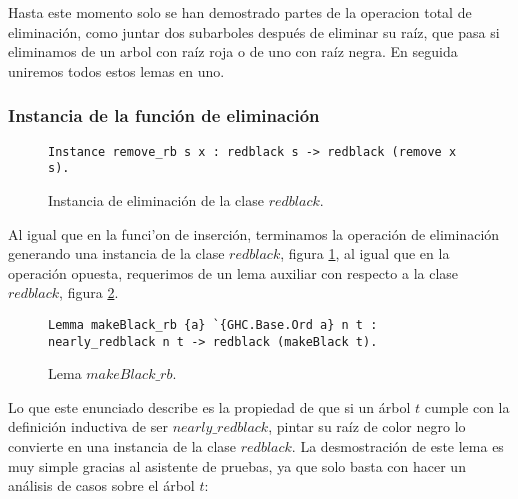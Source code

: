 Hasta este momento solo se han demostrado partes de la operacion total de eliminación, como juntar
dos subarboles despu\'es de eliminar su ra\'iz, que pasa si eliminamos de un arbol con raíz roja o
de uno con raíz negra. En seguida uniremos todos estos lemas en uno.

\subsubsection{Instancia de la funci\'on de eliminaci\'on}

\begin{figure}[!ht]
\centering
\captionsetup{justification=centering}
\begin{verbatim}
Instance remove_rb s x : redblack s -> redblack (remove x s).
\end{verbatim}
\caption{Instancia de eliminaci\'on de la clase $redblack$.}
\label{instance_del}
\end{figure}


Al igual que en la funci'on de inserción, terminamos la operación de eliminaci\'on generando una
instancia de la clase $redblack$, figura \ref{instance_del}, al igual que en la operación opuesta,
requerimos de un lema auxiliar con respecto a la clase $redblack$, figura \ref{lema_7}.

\begin{figure}[!ht]
\centering
\captionsetup{justification=centering}
\begin{verbatim}
Lemma makeBlack_rb {a} `{GHC.Base.Ord a} n t :
nearly_redblack n t -> redblack (makeBlack t).
\end{verbatim}
\caption{Lema $makeBlack\_rb$.}
\label{lema_7}
\end{figure}


Lo que este enunciado describe es la propiedad de que si un \'arbol $t$ cumple con la definici\'on
inductiva de ser $nearly\_redblack$, pintar su raíz de color negro lo convierte en una instancia de
la clase $redblack$. La desmostraci\'on de este lema es muy simple gracias al asistente de pruebas,
ya que solo basta con hacer un análisis de casos sobre el \'arbol $t$:

